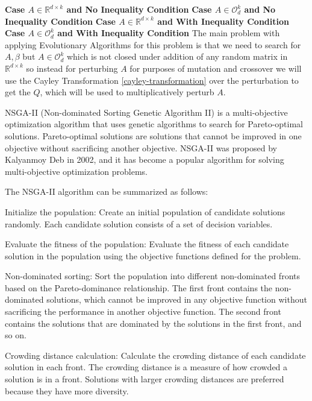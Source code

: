 \newline \textbf{Case $A \in \mathbb{R}^{d \times k}$ and No Inequality Condition}
\newline \textbf{Case $A \in \mathcal{O}_d^k$ and No Inequality Condition}
\newline \textbf{Case $A \in \mathbb{R}^{d \times k}$ and With Inequality Condition}
\newline \textbf{Case $A \in \mathcal{O}_d^k$ and With Inequality Condition}
The main problem with applying Evolutionary Algorithms for this problem is that we need to search for $A,\beta$ but $A \in \mathcal{O}^{k}_{d}$ which is not closed under addition of any random matrix in $\mathbb{R}^{d\times k}$ so instead for perturbing $A$ for purposes of mutation and crossover we will use the Cayley Transformation \ref{cayley-transformation} over the perturbation to get the $Q$, which will be used to multiplicatively perturb $A$.

NSGA-II (Non-dominated Sorting Genetic Algorithm II) is a multi-objective optimization algorithm that uses genetic algorithms to search for Pareto-optimal solutions. Pareto-optimal solutions are solutions that cannot be improved in one objective without sacrificing another objective. NSGA-II was proposed by Kalyanmoy Deb in 2002, and it has become a popular algorithm for solving multi-objective optimization problems.

The NSGA-II algorithm can be summarized as follows:

Initialize the population: Create an initial population of candidate solutions randomly. Each candidate solution consists of a set of decision variables.

Evaluate the fitness of the population: Evaluate the fitness of each candidate solution in the population using the objective functions defined for the problem.

Non-dominated sorting: Sort the population into different non-dominated fronts based on the Pareto-dominance relationship. The first front contains the non-dominated solutions, which cannot be improved in any objective function without sacrificing the performance in another objective function. The second front contains the solutions that are dominated by the solutions in the first front, and so on.

Crowding distance calculation: Calculate the crowding distance of each candidate solution in each front. The crowding distance is a measure of how crowded a solution is in a front. Solutions with larger crowding distances are preferred because they have more diversity.

